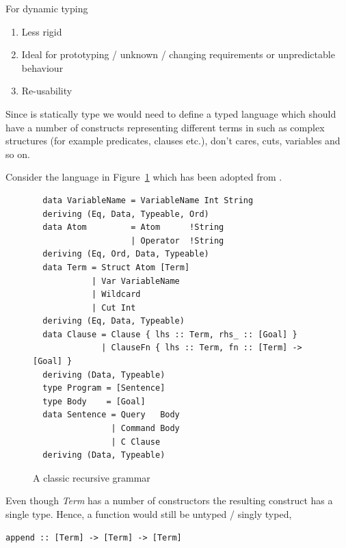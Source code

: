 \documentclass[thesis-solanki.tex]{subfiles}
\begin{document}
For dynamic typing
\begin{enumerate}
\item Less rigid
\item Ideal for prototyping / unknown / changing requirements or unpredictable behaviour
\item Re-usability
\end{enumerate}

Since  is statically type we would need to define a typed language which should have a
number of constructs representing different terms in  such as complex structures (for example
predicates, clauses etc.), don't cares, cuts, variables and so on.

Consider the language {in Figure~\ref{tab:closed-terms}} which has been adopted from
\cite{prolog-lib}.

\begin{figure}
\begin{verbatim}
  data VariableName = VariableName Int String
  deriving (Eq, Data, Typeable, Ord)
  data Atom         = Atom      !String
                    | Operator  !String
  deriving (Eq, Ord, Data, Typeable)
  data Term = Struct Atom [Term]
            | Var VariableName
            | Wildcard
            | Cut Int
  deriving (Eq, Data, Typeable)
  data Clause = Clause { lhs :: Term, rhs_ :: [Goal] }
              | ClauseFn { lhs :: Term, fn :: [Term] -> [Goal] }
  deriving (Data, Typeable)
  type Program = [Sentence]
  type Body    = [Goal]
  data Sentence = Query   Body
                | Command Body
                | C Clause
  deriving (Data, Typeable)
\end{verbatim}
  \caption{A classic recursive grammar}
  \label{tab:closed-terms}
\end{figure}

Even though \textit{Term} has a number of constructors the resulting construct has a single type. Hence, a function would still be untyped
/ singly typed,\par
\begin{verbatim}
append :: [Term] -> [Term] -> [Term]
\end{verbatim}

\end{document}
